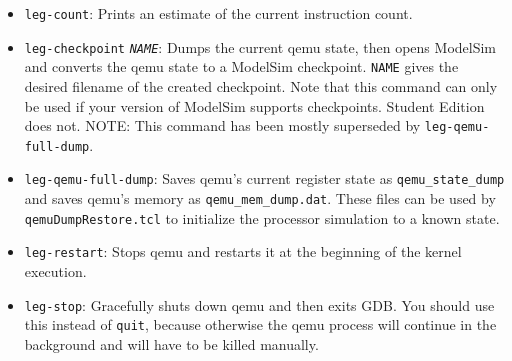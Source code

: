 \begin{itemize}
\item \texttt{leg-count}: Prints an estimate of the current instruction count.

\item \texttt{leg-checkpoint} \texttt{\emph{NAME}}: Dumps the current qemu state, then opens ModelSim and converts the qemu state to a ModelSim checkpoint. \texttt{NAME} gives the desired filename of the created checkpoint. Note that this command can only be used if your version of ModelSim supports checkpoints. Student Edition does not.
NOTE: This command has been mostly superseded by \texttt{leg-qemu-full-dump}.

\item \texttt{leg-qemu-full-dump}: Saves qemu's current register state as \texttt{qemu\_state\_dump} and saves qemu's memory as \texttt{qemu\_mem\_dump.dat}. These files can be used by \\\texttt{qemuDumpRestore.tcl} to initialize the processor simulation to a known state.

\item \texttt{leg-restart}: Stops qemu and restarts it at the beginning of the kernel execution.

\item \texttt{leg-stop}: Gracefully shuts down qemu and then exits GDB. You should use this instead of \texttt{quit}, because otherwise the qemu process will continue in the background and will have to be killed manually.
\end{itemize}